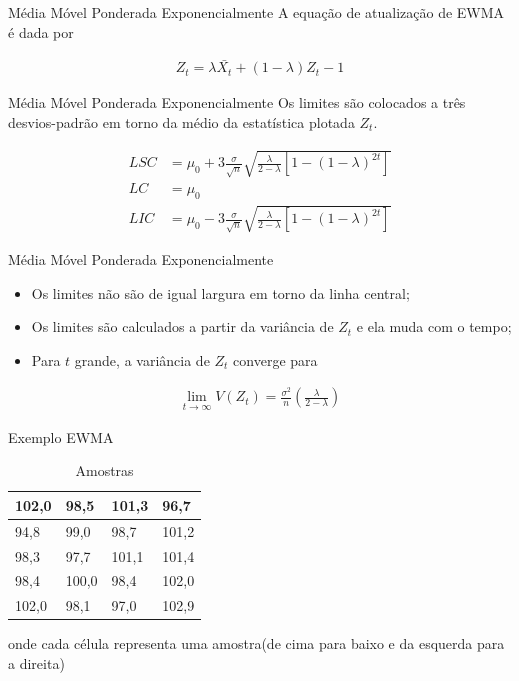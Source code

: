 \documentclass[12pt]{beamer}
\begin{document}
  \begin{frame}[t]{Média Móvel Ponderada Exponencialmente}
    A equação de atualização de EWMA é dada por

    \begin{align*}
      Z_t = \lambda \bar{X_t} + (1 - \lambda)Z_t - 1
    \end{align*}
  \end{frame}

  \begin{frame}[t]{Média Móvel Ponderada Exponencialmente}
    Os limites são colocados a três desvios-padrão em torno da médio da estatística plotada $Z_t$.

    \begin{align*}
      LSC & = \mu_0 + 3\frac{\sigma}{\sqrt{n}}\sqrt{\frac{\lambda}{2 - \lambda}[1 - (1 - \lambda)^{2t}]}\\
      LC  & = \mu_0\\
      LIC & = \mu_0 - 3\frac{\sigma}{\sqrt{n}}\sqrt{\frac{\lambda}{2 - \lambda}[1 - (1 - \lambda)^{2t}]}
    \end{align*}
  \end{frame}

  \begin{frame}[t]{Média Móvel Ponderada Exponencialmente}
    \begin{itemize}
      \item Os limites não são de igual largura em torno da linha central;

      \item Os limites são calculados a partir da variância de $Z_t$ e ela muda com o tempo;

      \item Para $t$ grande, a variância de $Z_t$ converge para
    \end{itemize}

    \begin{align*}
      \lim_{t \to \infty} V(Z_t) = {\frac{\sigma^2}{n}}(\frac{\lambda}{2 - \lambda})
    \end{align*}
  \end{frame}

  \begin{frame}[t]{Exemplo EWMA}
    \begin{table}[h]
      \centering

      \begin{tabular}{|l|l|l|l|}
        \hline
        102,0 & 98,5  & 101,3 & 96,7  \\ \hline
        94,8  & 99,0  & 98,7  & 101,2 \\ \hline
        98,3  & 97,7  & 101,1 & 101,4 \\ \hline
        98,4  & 100,0 & 98,4  & 102,0 \\ \hline
        102,0 & 98,1  & 97,0  & 102,9 \\ \hline
      \end{tabular}

      \caption{Amostras}
    \end{table}

    onde cada célula representa uma amostra(de cima para baixo e da esquerda para a direita)
  \end{frame}
\end{document}
